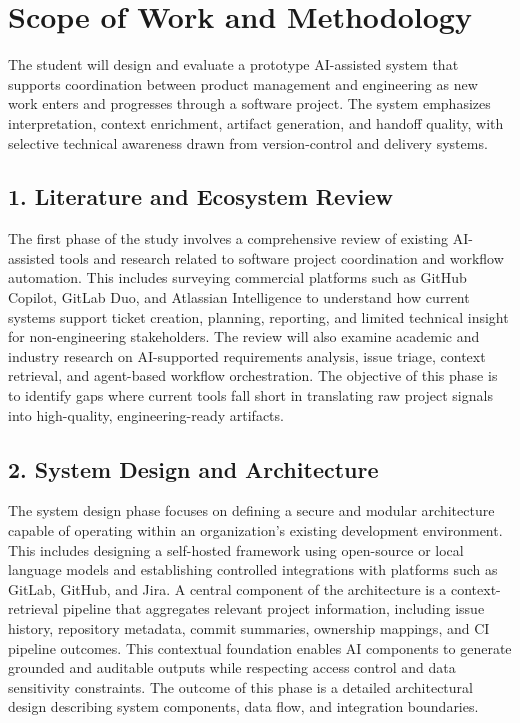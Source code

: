 \documentclass[11pt]{article}
\begin{document}
\section*{Scope of Work and Methodology}

The student will design and evaluate a prototype AI-assisted system that supports coordination between product management and engineering as new work enters and progresses through a software project. The system emphasizes interpretation, context enrichment, artifact generation, and handoff quality, with selective technical awareness drawn from version-control and delivery systems.

\subsection*{1. Literature and Ecosystem Review}

The first phase of the study involves a comprehensive review of existing AI-assisted tools and research related to software project coordination and workflow automation. This includes surveying commercial platforms such as GitHub Copilot, GitLab Duo, and Atlassian Intelligence to understand how current systems support ticket creation, planning, reporting, and limited technical insight for non-engineering stakeholders. The review will also examine academic and industry research on AI-supported requirements analysis, issue triage, context retrieval, and agent-based workflow orchestration. The objective of this phase is to identify gaps where current tools fall short in translating raw project signals into high-quality, engineering-ready artifacts.

\subsection*{2. System Design and Architecture}

The system design phase focuses on defining a secure and modular architecture capable of operating within an organization’s existing development environment. This includes designing a self-hosted framework using open-source or local language models and establishing controlled integrations with platforms such as GitLab, GitHub, and Jira. A central component of the architecture is a context-retrieval pipeline that aggregates relevant project information, including issue history, repository metadata, commit summaries, ownership mappings, and CI pipeline outcomes. This contextual foundation enables AI components to generate grounded and auditable outputs while respecting access control and data sensitivity constraints. The outcome of this phase is a detailed architectural design describing system components, data flow, and integration boundaries.
\end{document}
